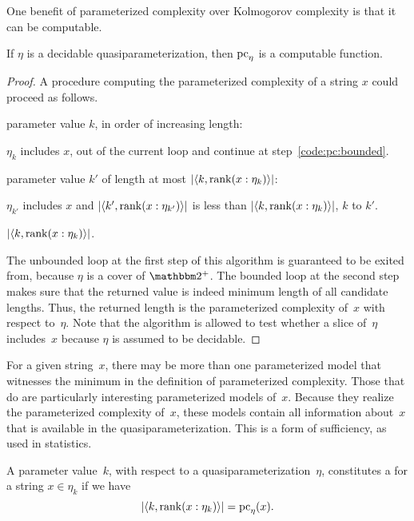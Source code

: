 One benefit of parameterized complexity over Kolmogorov complexity is that it can be computable.
\begin{lemma}
\label{lem:pccomputable}%
  If $\eta$ is a decidable quasiparameterization, then $\operatorname{pc}_\eta$ is a computable function.
\end{lemma}
\begin{proof}
  A procedure computing the parameterized complexity of a string $x$ could proceed as follows.
  \begin{codelisting}
  \item
     parameter value $k$, in order of increasing length:
    \begin{codelisting}
    \item
       $\eta_k$ includes $x$,
      \itemcont {} out of the current loop and continue at step~\ref{code:pc:bounded}.
    \end{codelisting}
  \item\label{code:pc:bounded}
     parameter value $k'$ of length at most ${\lvert{\langle k, \operatorname{rank}(x : \eta_k)\rangle}\rvert}$:
    \begin{codelisting}
    \item
       $\eta_{k'}$ includes $x$ and $\length{\pair{k'}{\rank(x : \eta_{k'})}}$ is less than $\length{\pair{k}{\rank(x : \eta_k)}}$,
      \itemcont {} $k$ to $k'$.
    \end{codelisting}
    \item
       ${\lvert{\langle k, \operatorname{rank}(x : \eta_k)\rangle}\rvert}$.
  \end{codelisting}
  The unbounded loop at the first step of this algorithm is guaranteed to be exited from, because $\eta$ is a cover of $\binary^+$.
  The bounded loop at the second step makes sure that the returned value is indeed minimum length of all candidate lengths.
  Thus, the returned length is the parameterized complexity of~$x$ with respect to~$\eta$.
  Note that the algorithm is allowed to test whether a slice of~$\eta$ includes~$x$ because $\eta$ is assumed to be decidable.
\end{proof}

For a given string~$x$, there may be more than one parameterized model that witnesses the minimum in the definition of parameterized complexity.
Those that do are particularly interesting parameterized models of~$x$.
Because they realize the parameterized complexity of~$x$, these models contain all information about~$x$ that is available in the quasiparameterization.
This is a form of sufficiency, as used in statistics.
\begin{definition}
  A parameter value~$k$, with respect to a quasiparameterization~$\eta$, constitutes a  for a string $x \in \eta_k$ if we have
  \begin{equation*}
    {\lvert{\langle k, \operatorname{rank}(x : \eta_k)\rangle}\rvert} = \operatorname{pc}_\eta(x).
  \end{equation*}
\end{definition}

